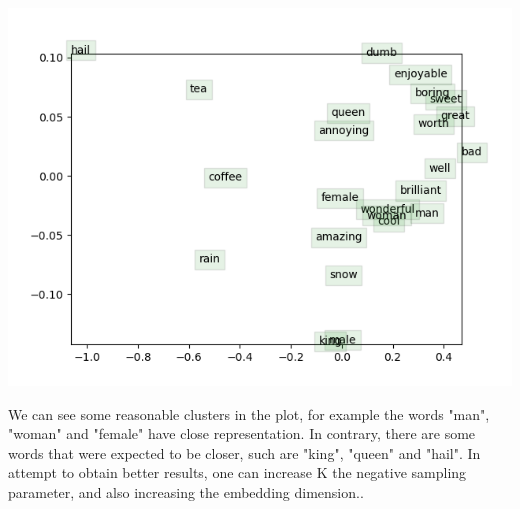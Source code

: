 \includegraphics{word_vectors.png}

We can see some reasonable clusters in the plot, for example the words "man", "woman" and "female" have close representation.
In contrary, there are some words that were expected to be closer, such are "king", "queen" and "hail".
In attempt to obtain better results, one can increase K the negative sampling parameter, and also increasing the embedding dimension..